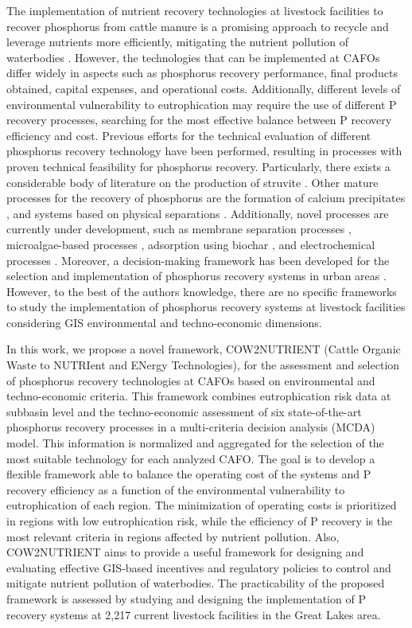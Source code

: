 \begin{refsection}[referencesCh4]
The implementation of nutrient recovery technologies at livestock facilities to recover phosphorus from cattle manure is a promising approach to recycle and leverage nutrients more efficiently, mitigating the nutrient pollution of waterbodies \citep{li2021toward}. However, the technologies that can be implemented at CAFOs differ widely in aspects such as phosphorus recovery performance, final products obtained, capital expenses, and operational costs. Additionally, different levels of environmental vulnerability to eutrophication may require the use of different P recovery processes, searching for the most effective balance between P recovery efficiency and cost.
Previous efforts for the technical evaluation of different phosphorus recovery technology have been performed, resulting in processes with proven technical feasibility for phosphorus recovery. Particularly, there exists a considerable body of literature on the production of struvite \citep{muhmood2019formation}. Other mature processes for the recovery of phosphorus are the formation of calcium precipitates \citep{berg2006phosphorus}, and systems based on physical separations \citep{church_novel_2016}. Additionally, novel processes are currently under development, such as membrane separation processes \citep{li2020application}, microalgae-based processes \citep{robles2020new}, adsorption using biochar \citep{wang2020phosphorus}, and electrochemical processes \citep{belarbi2020bench}.
Moreover, a decision-making framework has been developed for the selection and implementation of phosphorus recovery systems in urban areas \citep{pearce2015phosphorus}.
However, to the best of the authors knowledge, there are no specific frameworks to study the implementation of phosphorus recovery systems at livestock facilities considering GIS environmental and techno-economic dimensions.

In this work, we propose a novel framework, COW2NUTRIENT (Cattle Organic Waste to NUTRIent and ENergy Technologies), for the assessment and selection of phosphorus recovery technologies at CAFOs based on environmental and techno-economic criteria. This framework combines eutrophication risk data at subbasin level and the techno-economic assessment of six state-of-the-art phosphorus recovery processes in a multi-criteria decision analysis (MCDA) model. This information is normalized and aggregated for the selection of the most suitable technology for each analyzed CAFO. The goal is to develop a flexible framework able to balance the operating cost of the systems and P recovery efficiency as a function of the environmental vulnerability to eutrophication of each region. The minimization of operating costs is prioritized in regions with low eutrophication risk, while the efficiency of P recovery is the most relevant criteria in regions affected by nutrient pollution. Also, COW2NUTRIENT aims to provide a useful framework for designing and evaluating effective GIS-based incentives and regulatory policies to control and mitigate nutrient pollution of waterbodies. The practicability of the proposed framework is assessed by studying and designing the implementation of P recovery systems at 2,217 current livestock facilities in the Great Lakes area.


\end{refsection}
